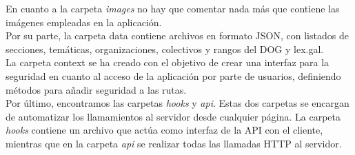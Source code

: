 En cuanto a la carpeta {\it images} no hay que comentar nada más que contiene las imágenes empleadas en la aplicación.
\\

Por su parte, la carpeta data contiene archivos en formato JSON, con listados de secciones, temáticas, organizaciones, colectivos y rangos del DOG y lex.gal.
\\

La carpeta context se ha creado con el objetivo de crear una interfaz para la seguridad en cuanto al acceso de la aplicación por parte de usuarios, definiendo métodos para añadir seguridad a las rutas.
\\

Por último, encontramos las carpetas {\it hooks} y {\it api}. Estas dos carpetas se encargan de automatizar los llamamientos al servidor desde cualquier página. La carpeta {\it hooks} contiene un archivo que actúa como interfaz de la API con el cliente, mientras que en la carpeta {\it api} se realizar todas las llamadas HTTP al servidor.
